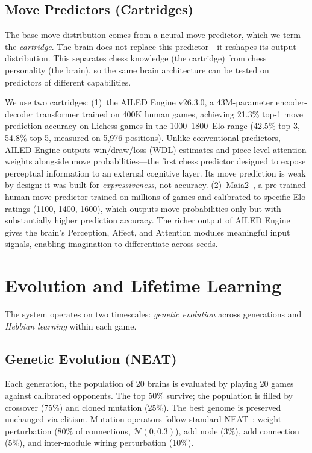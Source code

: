 \documentclass[11pt,a4paper]{article}
\begin{document}
\subsection{Move Predictors (Cartridges)}

The base move distribution comes from a neural move predictor, which we term the \emph{cartridge}.
The brain does not replace this predictor---it reshapes its output distribution.
This separates chess knowledge (the cartridge) from chess personality (the brain), so the same brain architecture can be tested on predictors of different capabilities.

We use two cartridges: (1)~the AILED Engine v26.3.0, a 43M-parameter encoder-decoder transformer trained on 400K human games, achieving 21.3\% top-1 move prediction accuracy on Lichess games in the 1000--1800~Elo range (42.5\% top-3, 54.8\% top-5, measured on 5{,}976 positions).
Unlike conventional predictors, AILED Engine outputs win/draw/loss (WDL) estimates and piece-level attention weights alongside move probabilities---the first chess predictor designed to expose perceptual information to an external cognitive layer.
Its move prediction is weak by design: it was built for \emph{expressiveness}, not accuracy.
(2)~Maia2~\citep{mcilroyyoung2022maia2}, a pre-trained human-move predictor trained on millions of games and calibrated to specific Elo ratings (1100, 1400, 1600), which outputs move probabilities only but with substantially higher prediction accuracy.
The richer output of AILED Engine gives the brain's Perception, Affect, and Attention modules meaningful input signals, enabling imagination to differentiate across seeds.

\section{Evolution and Lifetime Learning}

The system operates on two timescales: \emph{genetic evolution} across generations and \emph{Hebbian learning} within each game.

\subsection{Genetic Evolution (NEAT)}

Each generation, the population of 20 brains is evaluated by playing 20 games against calibrated opponents.
The top 50\% survive; the population is filled by crossover (75\%) and cloned mutation (25\%).
The best genome is preserved unchanged via elitism.
Mutation operators follow standard NEAT~\citep{stanley2002neat}: weight perturbation (80\% of connections, $\mathcal{N}(0, 0.3)$), add node (3\%), add connection (5\%), and inter-module wiring perturbation (10\%).
\end{document}
